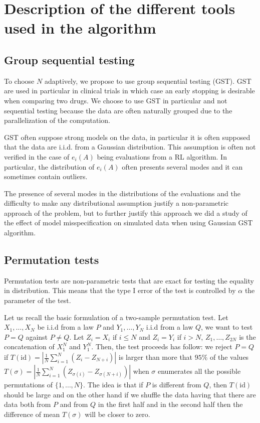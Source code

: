 \documentclass{article}
\theoremstyle{plain}
\theoremstyle{remark}
\newcommand{\1}{\mathbbm{1}}
\newcommand{\id}{\mathrm{id}}
\newcommand{\todoT}[1]{\todo[inline,color=blue!30]{{\textbf{T:}~}#1}}
\numberwithin{equation}{section}
\begin{document}
\section{Description of the different tools used in the algorithm}
\subsection{Group sequential testing}

To choose $N$ adaptively, we propose to use group sequential testing (GST). GST are used in particular in clinical trials in which case an early stopping is desirable when comparing two drugs. We choose to use GST in particular and not sequential testing because the data are often naturally grouped due to the parallelization of the computation.

GST often suppose strong models on the data, in particular it is often supposed that the data are i.i.d. from a Gaussian distribution. This assumption is often not verified in the case of $e_i(A)$ being evaluations from a RL algorithm. In particular, the distribution of $e_i(A)$ often presents several modes and it can sometimes contain outliers.

The presence of several modes in the distributions of the evaluations and the difficulty to make any distributional assumption justify a non-parametric approach of the problem, but to further justify this approach we did a study of the effect of model misspecification on simulated data when using Gaussian GST algorithm.

\todoT{Explain early accept also} 

\subsection{Permutation tests}
Permutation tests are non-parametric tests that are exact for testing the equality in distribution. This means that the type I error of the test is controlled by $\alpha$ the parameter of the test.

Let us recall the basic formulation of a two-sample permutation test. Let $X_1,\dots,X_N$ be i.i.d from a law $P$ and $Y_1,\dots,Y_N$ i.i.d from a law $Q$, we want to test $P=Q$ against $P \neq Q$. Let $Z_i = X_i$ if $i\le N$ and $Z_i = Y_i$ if $i>N$, $Z_1,\dots,Z_{2N}$ is the concatenation of $X_1^N$ and $Y_1^N$. Then, the test proceeds has follow: we reject $P=Q$ if $T(\id) = \left| \frac{1}{N}\sum_{i=1}^N(Z_i-Z_{N+i})\right|$ is larger than more that $95\%$ of the values $T(\sigma) =  \left| \frac{1}{N}\sum_{i=1}^N(Z_{\sigma(i)}-Z_{\sigma(N+i)})\right|$ when $\sigma$ enumerates all the possible permutations of $\{1,\dots,N\}$. The idea is that if $P$ is different from $Q$, then $T(\id)$ should be large and on the other hand if we shuffle the data having that there are data both from $P$ and from $Q$ in the first half and in the second half then the difference of mean $T(\sigma)$ will be closer to zero.
\end{document}
